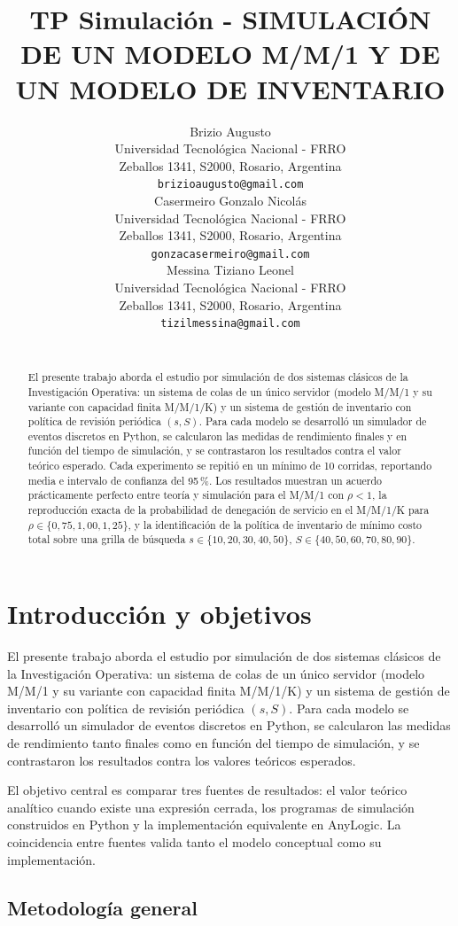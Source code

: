 \documentclass{article}
\title{TP Simulación - SIMULACIÓN DE UN MODELO M/M/1 Y DE UN MODELO DE INVENTARIO}
\author{
  Brizio Augusto \\
  Universidad Tecnológica Nacional - FRRO \\
  Zeballos 1341, S2000, Rosario, Argentina \\
  \texttt{brizioaugusto@gmail.com} \\
  \And
  Casermeiro Gonzalo Nicolás \\
  Universidad Tecnológica Nacional - FRRO \\
  Zeballos 1341, S2000, Rosario, Argentina \\
  \texttt{gonzacasermeiro@gmail.com} \\
  \And
  Messina Tiziano Leonel \\
  Universidad Tecnológica Nacional - FRRO \\
  Zeballos 1341, S2000, Rosario, Argentina \\
  \texttt{tizilmessina@gmail.com} \\
 \
}
\begin{document}
\maketitle

\begin{abstract}
El presente trabajo aborda el estudio por simulación de dos sistemas clásicos
de la Investigación Operativa: un sistema de colas de un único servidor
(modelo M/M/1 y su variante con capacidad finita M/M/1/K) y un sistema de
gestión de inventario con política de revisión periódica $(s,S)$. Para cada
modelo se desarrolló un simulador de eventos discretos en Python, se
calcularon las medidas de rendimiento finales y en función del tiempo de
simulación, y se contrastaron los resultados contra el valor teórico
esperado. Cada experimento se repitió en un mínimo de 10 corridas,
reportando media e intervalo de confianza del 95\,\%. Los resultados
muestran un acuerdo prácticamente perfecto entre teoría y simulación para el
M/M/1 con $\rho<1$, la reproducción exacta de la probabilidad de denegación
de servicio en el M/M/1/K para $\rho \in \{0{,}75, 1{,}00, 1{,}25\}$, y la
identificación de la política de inventario de mínimo costo total sobre una
grilla de búsqueda $s \in \{10,20,30,40,50\}$, $S \in
\{40,50,60,70,80,90\}$.
\end{abstract}

\section{Introducción y objetivos}

El presente trabajo aborda el estudio por simulación de dos sistemas clásicos
de la Investigación Operativa: un sistema de colas de un único servidor
(modelo M/M/1 y su variante con capacidad finita M/M/1/K) y un sistema de
gestión de inventario con política de revisión periódica $(s,S)$. Para cada
modelo se desarrolló un simulador de eventos discretos en Python, se
calcularon las medidas de rendimiento tanto finales como en función del
tiempo de simulación, y se contrastaron los resultados contra los valores
teóricos esperados.

El objetivo central es comparar tres fuentes de resultados: el valor
teórico analítico cuando existe una expresión cerrada, los programas de
simulación construidos en Python y la implementación equivalente en
AnyLogic. La coincidencia entre fuentes valida tanto el modelo conceptual
como su implementación.

\subsection{Metodología general}
\end{document}
